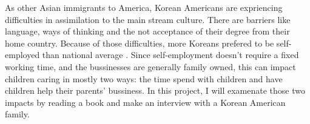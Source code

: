 As other Asian immigrants to America, Korean Americans are
expriencing difficulties in assimilation to the main stream culture.
There are barriers like language, ways of thinking and the not acceptance of
their degree from their home country. Because of those difficulties, more
Koreans prefered to be self-employed than national
average \cite{online:SelfEmployed}. Since self-employment doesn't require a
fixed working time, and the bussinesses are generally family owned, this can impact
children caring in mostly two ways: the time spend with children and have
children help their parents' bussiness. In this project, I will examenate those
two impacts by reading a book and make an interview with a Korean American
family.
